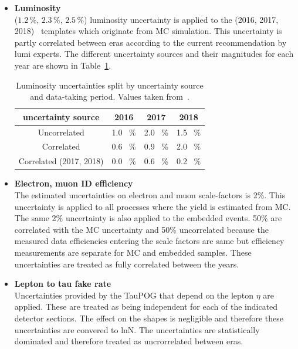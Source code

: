 \begin{itemize}
\item \textbf{Luminosity}\\
($1.2\,\%$, $2.3\,\%$, $2.5\,\%$) luminosity uncertainty is applied to the (2016, 2017, 2018)~\cite{CMS-PAS-LUM-17-003}\cite{CMS-PAS-LUM-17-004}\cite{CMS-PAS-LUM-18-002} templates which originate from MC simulation.
This uncertainty is partly correlated between eras according to the current recommendation by lumi experts. The different uncertainty sources and their magnitudes for each year are shown in Table~\ref{tab:lumi_unc}.
\begin{table}[!h]
\begin{center}
\caption{
    Luminosity uncertainties split by uncertainty source and data-taking period. Values taken from~\cite{LumiTwiki}.
}
\label{tab:lumi_unc}
{\footnotesize
\begin{tabular}{cccc}
\hline
uncertainty source & 2016 & 2017 & 2018 \\
\hline
Uncorrelated & 1.0 \, \% & 2.0 \, \% & 1.5 \, \% \\
Correlated & 0.6 \, \% & 0.9 \, \% & 2.0 \, \% \\
Correlated (2017, 2018) & 0.0 \, \% & 0.6 \, \% & 0.2 \, \% \\
\hline
\end{tabular}
} %
\end{center}
\end{table}

\item {\bf Electron, muon ID efficiency} \\
The estimated uncertainties on electron and muon scale-factors is 2\%.
This uncertainty is applied to all processes where the yield is estimated from MC.
The same 2\% uncertainty is also applied to the embedded events.
50\% are correlated with the MC uncertainty and 50\% uncorrelated because the measured data efficiencies entering the scale factors are same but efficiency measurements are separate for MC and embedded samples.
These uncertainties are treated as fully correlated between the years.

\item \textbf{Lepton to tau fake rate}\\
Uncertainties provided by the TauPOG that depend on the lepton $\eta$ are applied. These are treated as being independent for each of the indicated detector sections. The effect on the shapes
is negligible and therefore these uncertainties are convered to lnN.
The uncertainties are statistically dominated and therefore treated as uncrorrelated between eras.


\end{itemize}
